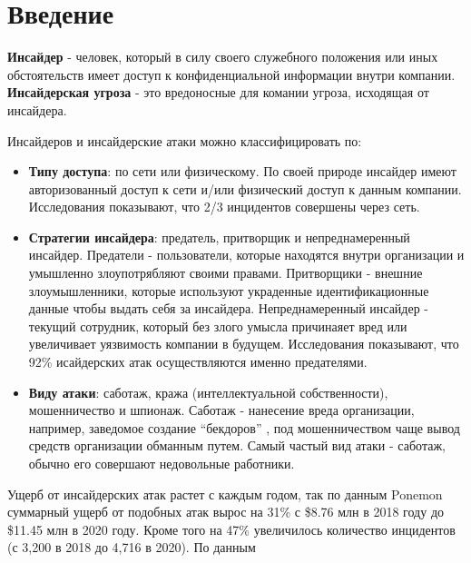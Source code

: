 \section*{Введение}
\textbf{Инсайдер} - человек, который в силу своего служебного положения или иных обстоятельств имеет доступ к конфиденциальной информации внутри компании.
\textbf{Инсайдерская угроза} - это вредоносные для комании угроза, исходящая от инсайдера. 

Инсайдеров и инсайдерские атаки можно классифицировать по: 
\begin{itemize}
\item \textbf{Типу доступа}: по сети или физическому. По своей природе инсайдер имеют авторизованный доступ к сети и/или физический доступ к данным компании. Исследования показывают, что 2/3 инцидентов совершены через сеть.\cite{review2020}
\item \textbf{Стратегии инсайдера}: предатель, притворщик и непреднамеренный инсайдер. Предатели - пользователи, которые находятся внутри организации и умышленно злоупотрябляют своими правами. Притворщики - внешние злоумышленники, которые используют украденные идентификационные данные чтобы выдать себя за инсайдера. Непреднамеренный инсайдер - текущий сотрудник, который без злого умысла причинаяет вред или увеличивает уязвимость компании в будущем. Исследования показывают, что 92\% исайдерских атак осуществляются именно предателями.\cite{review2020}
\item \textbf{Виду атаки}: саботаж, кража (интеллектуальной собственности), мошенничество и шпионаж. Саботаж - нанесение вреда организации, например, заведомое создание ``бекдоров'' , под мошенничеством чаще вывод средств организации обманным путем. Самый частый вид атаки - саботаж\cite{review2020}, обычно его совершают недовольные работники.
\end{itemize}

Ущерб от инсайдерских атак растет с каждым годом, так по данным Ponemon\cite{ponemon} суммарный ущерб от подобных атак вырос на 31\% с \$8.76 млн в 2018 году до \$11.45 млн в 2020 году. Кроме того на 47\% увеличилось количество инцидентов (с 3,200 в 2018 до 4,716 в 2020).  По данным 

